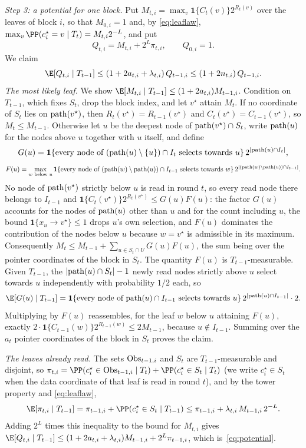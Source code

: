 \emph{Step 3: a potential for one block.}
Put $M_{t,i}=\max_v\mathbf 1\{C_t(v)\}2^{R_t(v)}$ over the leaves of block
$i$, so that $M_{0,i}=1$ and, by \eqref{eq:leaflaw},
$\max_v\PP(c_i^\star=v\mid T_t)=M_{t,i}2^{-L}$, and put
\[
 Q_{t,i}=M_{t,i}+2^L\pi_{t,i},\qquad Q_{0,i}=1 .
\]
We claim
\begin{equation}
 \E[Q_{t,i}\mid T_{t-1}]\le(1+2a_{t,i}+\lambda_{t,i})\,Q_{t-1,i}\le(1+2n_{t,i})\,Q_{t-1,i}.\label{eq:potential}
\end{equation}
\emph{The most likely leaf.} We show
$\E[M_{t,i}\mid T_{t-1}]\le(1+2a_{t,i})M_{t-1,i}$. Condition on $T_{t-1}$,
which fixes $S_t$, drop the block index, and let $v^\star$ attain $M_t$. If no
coordinate of $S_t$ lies on ${\rm path}(v^\star)$, then
$R_t(v^\star)=R_{t-1}(v^\star)$ and $C_t(v^\star)=C_{t-1}(v^\star)$, so
$M_t\le M_{t-1}$. Otherwise let $u$ be the deepest node of
${\rm path}(v^\star)\cap S_t$, write ${\rm path}(u)$ for the nodes above $u$
together with $u$ itself, and define
\[
 G(u)=\mathbf 1\{\text{every node of }({\rm path}(u)\setminus\{u\})\cap I_t\text{ selects towards }u\}\,2^{|{\rm path}(u)\cap I_t|},
\]
\[
 F(u)=\max_{w\text{ below }u}\mathbf 1\{\text{every node of }({\rm path}(w)\setminus{\rm path}(u))\cap I_{t-1}\text{ selects towards }w\}\,2^{|({\rm path}(w)\setminus{\rm path}(u))\cap I_{t-1}|}.
\]
No node of ${\rm path}(v^\star)$ strictly below $u$ is read in round $t$, so
every read node there belongs to $I_{t-1}$ and
$\mathbf 1\{C_t(v^\star)\}2^{R_t(v^\star)}\le G(u)F(u)$: the factor $G(u)$
accounts for the nodes of ${\rm path}(u)$ other than $u$ and for the count
including $u$, the bound $\mathbf 1\{x_u\to v^\star\}\le1$ drops $u$'s own
selection, and $F(u)$ dominates the contribution of the nodes below $u$
because $w=v^\star$ is admissible in its maximum. Consequently
$M_t\le M_{t-1}+\sum_{u\in S_t\cap U}G(u)F(u)$, the sum being over the
pointer coordinates of the block in $S_t$. The quantity $F(u)$ is
$T_{t-1}$-measurable. Given $T_{t-1}$, the $|{\rm path}(u)\cap S_t|-1$ newly
read nodes strictly above $u$ select towards $u$ independently with
probability $1/2$ each, so
\[
 \E[G(u)\mid T_{t-1}]
 =\mathbf 1\{\text{every node of }{\rm path}(u)\cap I_{t-1}\text{ selects towards }u\}\,
   2^{|{\rm path}(u)\cap I_{t-1}|}\cdot2 .
\]
Multiplying by $F(u)$ reassembles, for the leaf $w$ below $u$ attaining
$F(u)$, exactly $2\cdot\mathbf 1\{C_{t-1}(w)\}2^{R_{t-1}(w)}\le2M_{t-1}$,
because $u\notin I_{t-1}$. Summing over the $a_t$ pointer coordinates of the
block in $S_t$ proves the claim.

\emph{The leaves already read.} The sets ${\rm Obs}_{t-1,i}$ and $S_t$ are
$T_{t-1}$-measurable and disjoint, so
$\pi_{t,i}=\PP(c_i^\star\in{\rm Obs}_{t-1,i}\mid T_t)+\PP(c_i^\star\in S_t\mid T_t)$
(we write $c_i^\star\in S_t$ when the data coordinate of that leaf is read in round $t$),
and by the tower property and \eqref{eq:leaflaw},
\[
 \E[\pi_{t,i}\mid T_{t-1}]
 =\pi_{t-1,i}+\PP(c_i^\star\in S_t\mid T_{t-1})
 \le\pi_{t-1,i}+\lambda_{t,i}\,M_{t-1,i}\,2^{-L}.
\]
Adding $2^L$ times this inequality to the bound for $M_{t,i}$ gives
$\E[Q_{t,i}\mid T_{t-1}]\le(1+2a_{t,i}+\lambda_{t,i})M_{t-1,i}+2^L\pi_{t-1,i}$,
which is~\eqref{eq:potential}.

